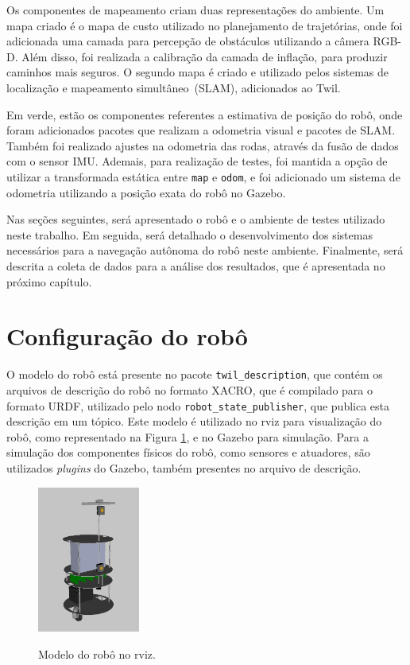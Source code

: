 \documentclass[repeatfields,xlists,xpacks,oneside,yearsonly]{ufrgscca}
\begin{document}
Os componentes de mapeamento criam duas representações do ambiente.
Um mapa criado é o mapa de custo utilizado no planejamento de
trajetórias, onde foi adicionada uma camada para percepção de
obstáculos utilizando a câmera RGB-D. Além disso, foi realizada a
calibração da camada de inflação, para produzir caminhos mais
seguros. O segundo mapa é criado e utilizado pelos sistemas de
localização e mapeamento simultâneo~(SLAM), adicionados ao Twil.

Em verde, estão os componentes referentes a estimativa de posição do
robô, onde foram adicionados pacotes que realizam a odometria visual
e pacotes de SLAM. Também foi realizado ajustes na odometria das
rodas, através da fusão de dados com o sensor IMU. Ademais, para
realização de testes, foi mantida a opção de utilizar a transformada
estática entre \texttt{map} e \texttt{odom}, e foi adicionado um
sistema de odometria utilizando a posição exata do robô no Gazebo.

Nas seções seguintes, será apresentado o robô e o ambiente de testes
utilizado neste trabalho. Em seguida, será detalhado o
desenvolvimento dos sistemas necessários para a navegação autônoma do
robô neste ambiente. Finalmente, será descrita a coleta de dados para
a análise dos resultados, que é apresentada no próximo capítulo.

\section{Configuração do robô}

O modelo do robô está presente no pacote \texttt{twil\_description},
que contém os arquivos de descrição do robô no formato XACRO, que é
compilado para o formato URDF, utilizado pelo nodo
\texttt{robot\_state\_publisher}, que publica esta descrição em um
tópico. Este modelo é utilizado no rviz para visualização do robô,
como representado na Figura \ref{fig:robo_rviz}, e no Gazebo para
simulação. Para a simulação dos componentes físicos do robô, como
sensores e atuadores, são utilizados \textit{plugins} do Gazebo,
também presentes no arquivo de descrição.


\begin{figure}[h]
    {
        \centering
        \caption{Modelo do robô no rviz.}
        \label{fig:robo_rviz}
        \includegraphics[width=0.3\textwidth]{robo_rviz.png}\\
    }
\end{figure}
\end{document}
